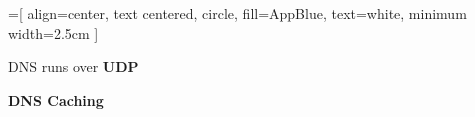 \begin{frame}[t]\begin{center}\normalsize{
	=[
			align=center, 
			text centered,
			circle,
			fill=AppBlue,
			text=white,
			minimum width=2.5cm
		]
}
\end{center}\end{frame}

\begin{cf}{
DNS runs over \textbf{UDP}
}
\end{cf}

\begin{cf}{
\textbf{DNS Caching}
}
\end{cf}
